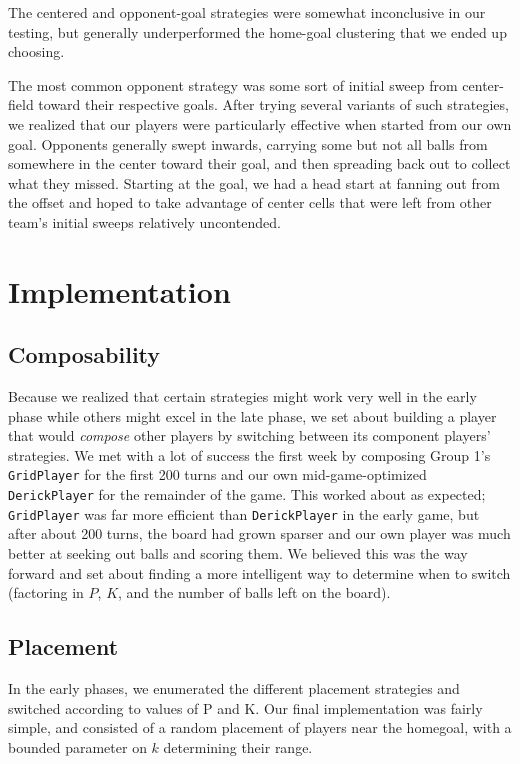 \documentclass[
10pt, %
letterpaper, %
oneside, %
headinclude,footinclude, %
english
]{article}
\begin{document}
The centered and opponent-goal strategies were somewhat inconclusive in our testing, but generally underperformed the home-goal clustering that we ended up choosing.

The most common opponent strategy was some sort of initial sweep from center-field toward their respective goals. After trying several variants of such strategies, we realized that our players were particularly effective when started from our own goal. Opponents generally swept inwards, carrying some but not all balls from somewhere in the center toward their goal, and then spreading back out to collect what they missed. Starting at the goal, we had a head start at fanning out from the offset and hoped to take advantage of center cells that were left from other team's initial sweeps relatively uncontended.
\section{Implementation}

\subsection{Composability}
Because we realized that certain strategies might work very well in the early phase while others might excel in the late phase, we set about building a player that would \textit{compose} other players by switching between its component players' strategies. We met with a lot of success the first week by composing Group 1's \texttt{GridPlayer} for the first 200 turns and our own mid-game-optimized \texttt{DerickPlayer} for the remainder of the game. This worked about as expected; \texttt{GridPlayer} was far more efficient than \texttt{DerickPlayer} in the early game, but after about 200 turns, the board had grown sparser and our own player was much better at seeking out balls and scoring them. We believed this was the way forward and set about finding a more intelligent way to determine when to switch (factoring in $P$, $K$, and the number of balls left on the board).

\subsection{Placement}
In the early phases, we enumerated the different placement strategies and switched according to values of P and K. Our final implementation was fairly simple, and consisted of a random placement of players near the homegoal, with a bounded parameter on $k$ determining their range.
\end{document}
